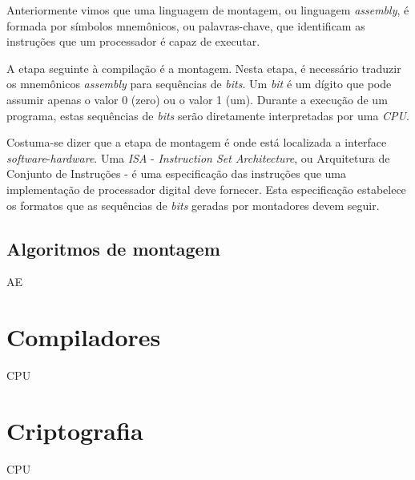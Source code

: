 Anteriormente vimos que uma linguagem de montagem, ou linguagem \textit{assembly}, é formada por símbolos mnemônicos, ou palavras-chave, que identificam as instruções que um processador é capaz de executar.

A etapa seguinte à compilação é a montagem. Nesta etapa, é necessário traduzir os mnemônicos \textit{assembly} para sequências de \textit{bits}. Um \textit{bit} é um dígito que pode assumir apenas o valor 0 (zero) ou o valor 1 (um). Durante a execução de um programa, estas sequências de \textit{bits} serão diretamente interpretadas por uma \textit{CPU}.

Costuma-se dizer que a etapa de montagem é onde está localizada a interface \textit{software}-\textit{hardware}. Uma \textit{ISA} - \textit{Instruction Set Architecture}, ou Arquitetura de Conjunto de Instruções - é uma especificação das instruções que uma implementação de processador digital deve fornecer. Esta especificação estabelece os formatos que as sequências de \textit{bits} geradas por montadores devem seguir.

\subsection{Algoritmos de montagem}

AE

\section{Compiladores}

CPU

\section{Criptografia}

CPU
